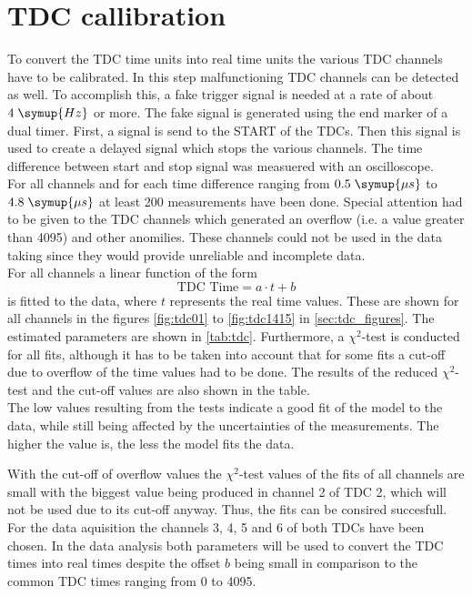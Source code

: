 \section{TDC callibration}
To convert the TDC time units into real time units the various TDC channels have to be calibrated.
In this step malfunctioning TDC channels can be detected as well. To accomplish this,
a fake trigger signal is needed at a rate of about $4 \; \symup{Hz}$ or more. The fake signal is generated using the 
end marker of a dual timer. First, a signal is send to the START of the TDCs. Then this signal is used 
to create a delayed signal which stops the various channels. The time difference between start and stop signal was measuered with 
an oscilloscope. \\
For all channels and for each time difference ranging from $0.5 \; \symup{\mu s}$ to $4.8 \; \symup{\mu s}$ 
at least 200 measurements have been done.
Special attention had to be given to the TDC channels which generated an overflow (i.e. a value greater than 4095)
and other anomilies.
These channels could not be used in the data taking since they would provide unreliable
and incomplete data.\\
For all channels a linear function of the form 
\begin{equation*}
    \text{TDC Time} = a \cdot t + b
\end{equation*}
is fitted to the data, where $t$ represents the real time values.
These are shown for all channels in the figures \ref{fig:tdc01} to
\ref{fig:tdc1415} in \autoref{sec:tdc_figures}.
The estimated parameters are shown in \autoref{tab:tdc}. Furthermore, a $\chi^2$-test is conducted 
for all fits, although it has to be taken into account that for some fits a cut-off due to overflow of
the time values had to be done. The results of the reduced $\chi^2$-test and the cut-off values 
are also shown in the table.\\
The low values resulting from the tests indicate a good fit of the model to the data, while still being affected by the uncertainties 
of the measurements. The higher the value is, the less the model fits the data.

With the cut-off of overflow values the $\chi^2$-test values of the fits of all channels are 
small with the biggest value being produced in channel 2 of TDC 2, which will not be used due to 
its cut-off anyway. Thus, the fits can be consired succesfull. 
For the data aquisition the channels 3, 4, 5 and 6 of both TDCs have been chosen.
In the data analysis both parameters will be used to convert the TDC times into real times despite the 
offset $b$ being small in comparison to the common TDC times ranging from 0 to 4095.


